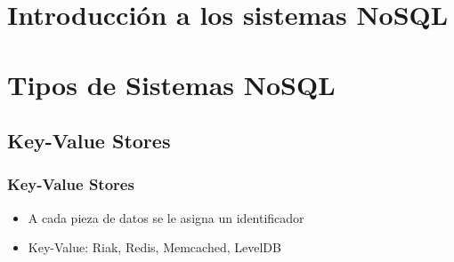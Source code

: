 \documentclass[14pt]{beamer}
\begin{document}



\section{Introducción a los sistemas NoSQL}

%

\section{Tipos de Sistemas NoSQL}

\subsection{Key-Value Stores}

\begin{frame}
  \frametitle{Key-Value Stores}
\begin{itemize}
\item A cada pieza de datos se le asigna un identificador
\item Key-Value: Riak, Redis, Memcached, LevelDB
\end{itemize}
\end{frame}
\end{document}
